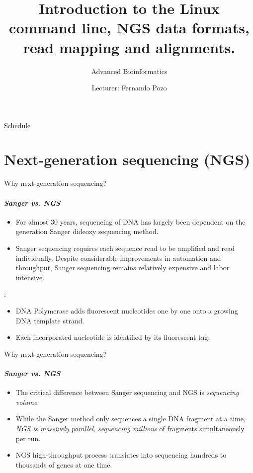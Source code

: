 \documentclass{if-beamer}
\title[Advanced Bioinformatics]{Introduction to the Linux command line, NGS data formats, read mapping and alignments.}
\subtitle{Advanced Bioinformatics}
\author{Lecturer: Fernando Pozo} \
\institute[UFV]{
  \begin{normalsize}
  \href{mailto:fpozoc@cnio.es}{fpozoc@cnio.es}
  \end{normalsize}
\\~\\
  Bioinformatics Unit, \\
  Spanish National Cancer Research Centre (CNIO) 
}
\date{\displaydate{date}}
\begin{document}
\begin{frame}
  \titlepage
\end{frame}

\begin{frame}{Schedule}
  \tableofcontents
\end{frame}


\section{Next-generation sequencing (NGS)}
\begin{frame}{Why next-generation sequencing?}
\framesubtitle{\emph{Sanger vs. NGS}}
\begin{large}
\begin{itemize}
    \item For almost 30 years, sequencing of DNA has largely been dependent on the  generation Sanger dideoxy sequencing method. 
    \item Sanger sequencing requires each sequence read to be amplified and read individually. Despite considerable improvements in automation and throughput, Sanger sequencing remains relatively expensive and labor intensive.
\end{itemize}
:
\begin{itemize}
    \item DNA Polymerase adds fluorescent nucleotides one by one onto a growing DNA template strand. 
    \item Each incorporated nucleotide is identified by its fluorescent tag.
\end{itemize}
\end{large}
\end{frame}
\begin{frame}{Why next-generation sequencing?}
\framesubtitle{\emph{Sanger vs. NGS}}
\begin{large}
\begin{itemize}
    \item The critical difference between Sanger sequencing and NGS is \emph{sequencing volume}.
    \item While the Sanger method only sequences a single DNA fragment at a time, \emph{NGS is massively parallel, sequencing millions} of fragments simultaneously per run. 
    \item NGS high-throughput process translates into sequencing hundreds to thousands of genes at one time.
\end{itemize}
\end{large}
\end{frame}
\end{document}
